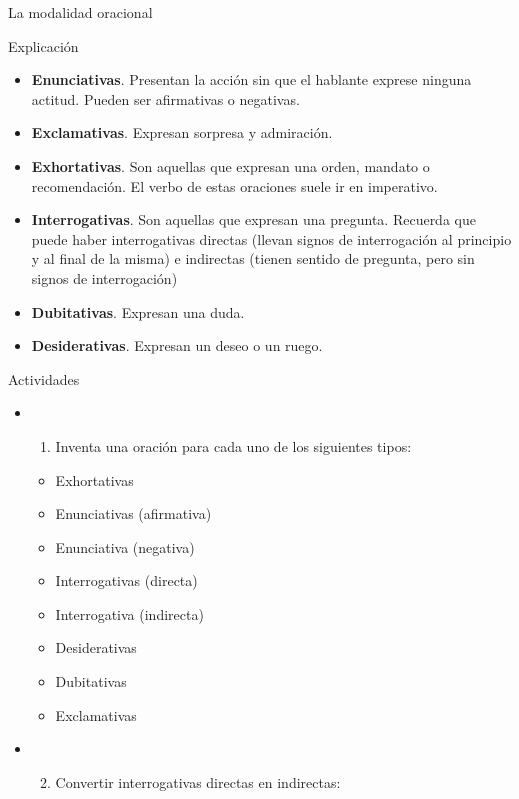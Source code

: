 \documentclass[ignorenonframetext,]{beamer}
\providecommand{\tightlist}{%
  \setlength{\itemsep}{0pt}\setlength{\parskip}{0pt}}
\begin{document}
\begin{frame}{La modalidad oracional}
\begin{block}{Explicación}
\begin{itemize}
\tightlist
\item
  \textbf{Enunciativas}. Presentan la acción sin que el hablante exprese
  ninguna actitud. Pueden ser afirmativas o negativas.
\item
  \textbf{Exclamativas}. Expresan sorpresa y admiración.
\item
  \textbf{Exhortativas}. Son aquellas que expresan una orden, mandato o
  recomendación. El verbo de estas oraciones suele ir en imperativo.
\item
  \textbf{Interrogativas}. Son aquellas que expresan una pregunta.
  Recuerda que puede haber interrogativas directas (llevan signos de
  interrogación al principio y al final de la misma) e indirectas
  (tienen sentido de pregunta, pero sin signos de interrogación)
\item
  \textbf{Dubitativas}. Expresan una duda.
\item
  \textbf{Desiderativas}. Expresan un deseo o un ruego.
\end{itemize}

\end{block}

\begin{block}{Actividades}

\begin{itemize}
\item
  \begin{enumerate}
  \tightlist
  \item
    Inventa una oración para cada uno de los siguientes tipos:
  \end{enumerate}

  \begin{itemize}
  \tightlist
  \item
    Exhortativas
  \item
    Enunciativas (afirmativa)
  \item
    Enunciativa (negativa)
  \item
    Interrogativas (directa)
  \item
    Interrogativa (indirecta)
  \item
    Desiderativas
  \item
    Dubitativas
  \item
    Exclamativas
  \end{itemize}
\item
  \begin{enumerate}
  \setcounter{enumi}{1}
  \tightlist
  \item
    Convertir interrogativas directas en indirectas:
  \end{enumerate}


\end{itemize}
\end{block}
\end{frame}
\end{document}
